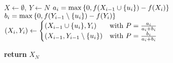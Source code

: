 \begin{algorithm}
	\caption{}\label{alg:rand_double_greedy}
	\begin{algorithmic}[1]
		\State $X \gets \emptyset$, $Y \gets N$
		\State $a_i = \max \qty{0,f(X_{i-1} \cup \qty{u_i})-f(X_i)}$
		\State $b_i = \max \qty{0,f(Y_{i-1} \setminus \qty{u_i})-f(Y_i)}$
		\State $(X_i,Y_i) \gets\begin{cases}
		\qty(X_{i-1} \cup \qty{u_i}, Y_i) & \text{with } P= \frac{a_i}{a_i+b_i} \\
		\qty(X_{i-1} ,Y_{i-1} \setminus \qty{u_i}) & \text{with } P= \frac{b_i}{a_i+b_i} 
		\end{cases}$
		
		\EndFor
		\State \textbf{return} $X_N$
		\EndProcedure
	\end{algorithmic}
\end{algorithm}